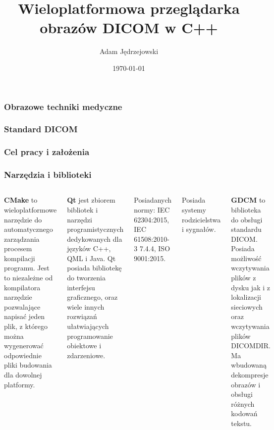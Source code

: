 \documentclass[aspectratio=169]{beamer}
\title{Wieloplatformowa przeglądarka obrazów DICOM w C++}
\author{Adam Jędrzejowski}
\date{\today}
\begin{document}
\begin{frame}
    \titlepage
\end{frame}

\begin{frame}
    \frametitle{Obrazowe techniki medyczne}
\end{frame}

\begin{frame}
    \frametitle{Standard DICOM}
\end{frame}

\begin{frame}
    \frametitle{Cel pracy i założenia}
\end{frame}

\begin{frame}[t]
    \frametitle{Narzędzia i biblioteki}

    \begin{columns}[t]
        \textbf{\LARGE CMake}
        \scriptsize
        to wieloplatformowe narzędzie do automatycznego zarządzania procesem kompilacji programu.
        Jest to niezależne od kompilatora narzędzie pozwalające napisać jeden plik, z którego można wygenerować odpowiednie pliki budowania dla dowolnej platformy.

        \textbf{\LARGE Qt}
        \scriptsize
        jest zbiorem bibliotek i narzędzi programistycznych dedykowanych dla języków C++, QML i Java.
        Qt posiada bibliotekę do tworzenia interfejsu graficznego, oraz wiele innych rozwiązań ułatwiających programowanie obiektowe i zdarzeniowe.

        Posiadanych normy: IEC 62304:2015, IEC 61508:2010-3 7.4.4, ISO 9001:2015.

        Posiada systemy rodzicielstwa i sygnałów.

        \textbf{\LARGE GDCM}
        \scriptsize
        to biblioteka do obsługi standardu DICOM.
        Posiada możliwość wczytywania plików z dysku jak i z lokalizacji sieciowych oraz wczytywania plików DICOMDIR.
        Ma wbudowaną dekompresje obrazów i obsługi różnych kodowań tekstu.

    \end{columns}


    \begin{columns}[c]


\end{columns}
\end{frame}
\end{document}
